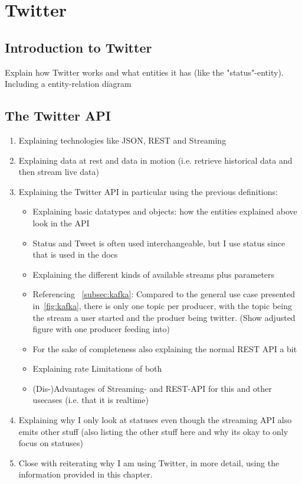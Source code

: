 \chapter{Twitter}
\label{ch:twitter}

\section{Introduction to Twitter}
\label{sec:twitter}

Explain how Twitter works and what entities it has (like the "status"-entity).
Including a entity-relation diagram

\section{The Twitter API}
\label{sec:theApi}

\begin{enumerate}
    \item
    Explaining technologies like JSON, REST and Streaming
    \item
    Explaining data at rest and data in motion (i.e. retrieve historical data and then stream live data)
    \item
    Explaining the Twitter API in particular using the previous definitions:
    \begin{itemize}
        \item
        Explaining basic datatypes and objects: how the entities explained above look in the API
        \item
        Status and Tweet is often used interchangeable, but I use status since that is used in the docs
        \item
        Explaining the different kinds of available streams plus parameters
        \item
        Referencing ~\ref{subsec:kafka}: Compared to the general use case presented in~\ref{fig:kafka},
        there is only one topic per producer, with the topic being the stream a user started and the produer being twitter.
        (Show adjusted figure with one producer feeding into)
        \item
        For the sake of completeness also explaining the normal REST API a bit
        \item
        Explaining rate Limitations of both
        \item
        (Dis-)Advantages of Streaming- and REST-API for this and other usecases (i.e. that it is realtime)
    \end{itemize}
    \item
    Explaining why I only look at statuses even though the streaming API also emits other stuff (also listing the other stuff here and why its okay to only focus on statuses)
    \item
    Close with reiterating why I am using Twitter, in more detail, using the information provided in this chapter.
\end{enumerate}

